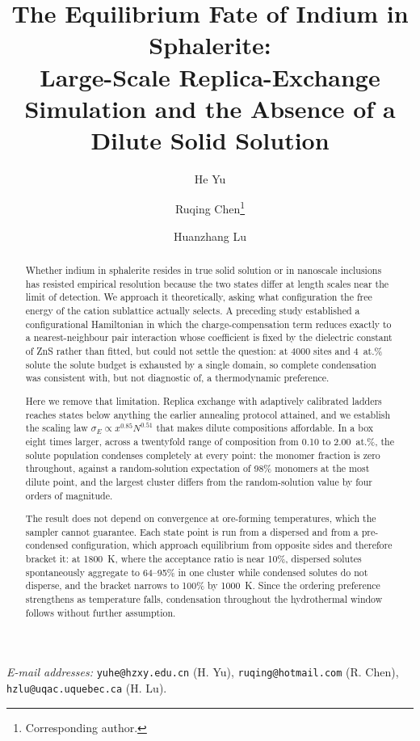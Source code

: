 \documentclass[11pt,a4paper]{article}
\title{\bfseries The Equilibrium Fate of Indium in Sphalerite:\\
Large-Scale Replica-Exchange Simulation and the Absence of a\\
Dilute Solid Solution}
\author[1]{He Yu}
\author[2]{Ruqing Chen\thanks{Corresponding author.}}
\author[3]{Huanzhang Lu}
\affil[1]{Geological Laboratory, Hezhou University, Hezhou, Guangxi 542899, China}
\affil[2]{GUT Geoservice Inc., Montreal, Quebec, Canada}
\affil[3]{D\'epartement des sciences appliqu\'ees et Centre d'\'etudes sur les
ressources min\'erales, Universit\'e du Qu\'ebec \`a Chicoutimi, Quebec, Canada}
\date{}
\begin{document}
\maketitle

\noindent\small
\textit{E-mail addresses:} \texttt{yuhe@hzxy.edu.cn} (H. Yu),
\texttt{ruqing@hotmail.com} (R. Chen), \texttt{hzlu@uqac.uquebec.ca} (H. Lu).
\normalsize

\begin{abstract}
\noindent
Whether indium in sphalerite resides in true solid solution or in nanoscale
inclusions has resisted empirical resolution because the two states differ at
length scales near the limit of detection. We approach it theoretically, asking
what configuration the free energy of the cation sublattice actually selects. A
preceding study established a configurational Hamiltonian in which the
charge-compensation term reduces exactly to a nearest-neighbour pair
interaction whose coefficient is fixed by the dielectric constant of ZnS rather
than fitted, but could not settle the question: at 4000 sites and 4~at.\% solute
the solute budget is exhausted by a single domain, so complete condensation was
consistent with, but not diagnostic of, a thermodynamic preference.

Here we remove that limitation. Replica exchange with adaptively calibrated
ladders reaches states below anything the earlier annealing protocol attained,
and we establish the scaling law $\sigma_E \propto x^{0.85} N^{0.51}$ that makes
dilute compositions affordable. In a box eight times larger, across a twentyfold
range of composition from 0.10 to 2.00~at.\%, the solute population condenses
completely at every point: the monomer fraction is zero throughout, against a
random-solution expectation of 98\% monomers at the most dilute point, and the
largest cluster differs from the random-solution value by four orders of
magnitude.

The result does not depend on convergence at ore-forming temperatures, which the
sampler cannot guarantee. Each state point is run from a dispersed and from a
pre-condensed configuration, which approach equilibrium from opposite sides and
therefore bracket it: at 1800~K, where the acceptance ratio is near 10\%,
dispersed solutes spontaneously aggregate to 64--95\% in one cluster while
condensed solutes do not disperse, and the bracket narrows to 100\% by 1000~K.
Since the ordering preference strengthens as temperature falls, condensation
throughout the hydrothermal window follows without further assumption.


\end{abstract}
\end{document}
